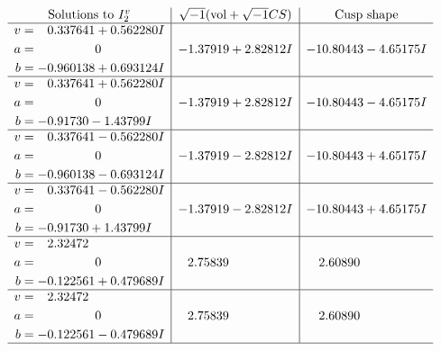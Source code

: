 \documentclass[1p]{elsarticle_modified}
\theoremstyle{definition}
\newcommand{\I}{\sqrt{-1}}
\begin{document}
$$\begin{array}{c|c|c}  
\text{Solutions to }I^v_{2}& \I (\text{vol} + \sqrt{-1}CS) & \text{Cusp shape}\\
 \hline 
\begin{aligned}
v &= \phantom{-}0.337641 + 0.562280 I \\
a &= \phantom{-0.000000 } 0 \\
b &= -0.960138 + 0.693124 I\end{aligned}
 & -1.37919 + 2.82812 I & -10.80443 - 4.65175 I \\ \hline\begin{aligned}
v &= \phantom{-}0.337641 + 0.562280 I \\
a &= \phantom{-0.000000 } 0 \\
b &= -0.91730 - 1.43799 I\end{aligned}
 & -1.37919 + 2.82812 I & -10.80443 - 4.65175 I \\ \hline\begin{aligned}
v &= \phantom{-}0.337641 - 0.562280 I \\
a &= \phantom{-0.000000 } 0 \\
b &= -0.960138 - 0.693124 I\end{aligned}
 & -1.37919 - 2.82812 I & -10.80443 + 4.65175 I \\ \hline\begin{aligned}
v &= \phantom{-}0.337641 - 0.562280 I \\
a &= \phantom{-0.000000 } 0 \\
b &= -0.91730 + 1.43799 I\end{aligned}
 & -1.37919 - 2.82812 I & -10.80443 + 4.65175 I \\ \hline\begin{aligned}
v &= \phantom{-}2.32472\phantom{ +0.000000I} \\
a &= \phantom{-0.000000 } 0 \\
b &= -0.122561 + 0.479689 I\end{aligned}
 & \phantom{-}2.75839\phantom{ +0.000000I} & \phantom{-}2.60890\phantom{ +0.000000I} \\ \hline\begin{aligned}
v &= \phantom{-}2.32472\phantom{ +0.000000I} \\
a &= \phantom{-0.000000 } 0 \\
b &= -0.122561 - 0.479689 I\end{aligned}
 & \phantom{-}2.75839\phantom{ +0.000000I} & \phantom{-}2.60890\phantom{ +0.000000I}\\
 \hline 
 \end{array}$$\newpage
\end{document}
